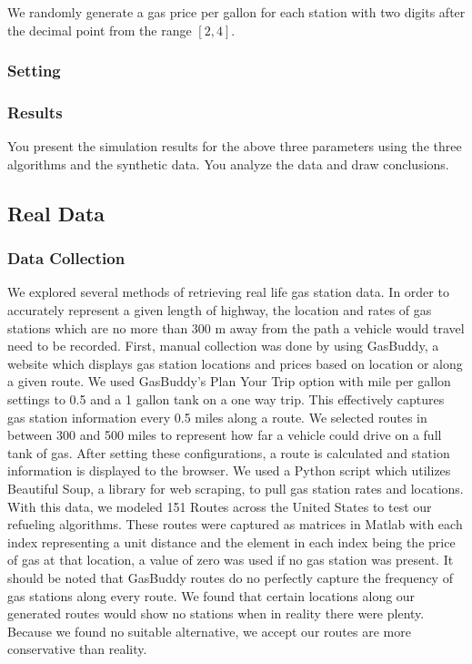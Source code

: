 \documentclass[conference]{IEEEtran}
\theoremstyle{definition}
\begin{document}
We randomly generate a gas price per gallon for each station with two digits after the decimal point from the range $[2, 4]$.

\subsubsection{Setting}

\subsubsection{Results}
You present the simulation results for the above three parameters using the three algorithms and the synthetic data. You analyze the data and draw conclusions. 


\subsection{Real Data}

\subsubsection{Data Collection}
We explored several methods of retrieving real life gas station data. In order to accurately represent a given length of highway, the location and rates of gas stations which are no more than 300 m away from the path a vehicle would travel need to be recorded. First, manual collection was done by using GasBuddy, a website which displays gas station locations and prices based on location or along a given route. We used GasBuddy’s Plan Your Trip option with mile per gallon settings to 0.5 and a 1 gallon tank on a one way trip. This effectively captures gas station information every 0.5 miles along a route. We selected routes in between 300 and 500 miles to represent how far a vehicle could drive on a full tank of gas. After setting these configurations, a route is calculated and station information is displayed to the browser. We used a Python script which utilizes Beautiful Soup, a library for web scraping, to pull gas station rates and locations. With this data, we modeled 151 Routes across the United States to test our refueling algorithms. These routes were captured as matrices in Matlab with each index representing a unit distance and the element in each index being the price of gas at that location, a value of zero was used if no gas station was present. It should be noted that GasBuddy routes do no perfectly capture the frequency of gas stations along every route. We found that certain locations along our generated routes would show no stations when in reality there were plenty. Because we found no suitable alternative, we accept our routes are more conservative than reality.
\end{document}
